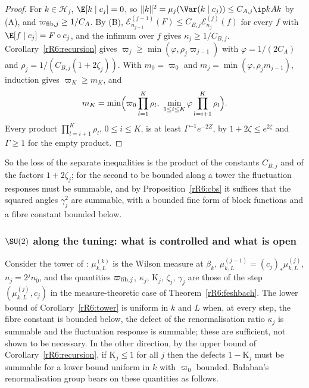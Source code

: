 \begin{proof}
For $k\in\mathcal H_f$, $\E[k\mid c_j]=0$, so $\lVert k\rVert^2=\mu_j(\Var
(k\mid c_j))\le C_{A,j}\ip kAk$ by (A), and $\varpi_{{\rm fib},j}\ge1/C_A$.
By (B), $\mathcal E^{(j-1)}_{n_{j-1}}(F)\le C_{B,j}\mathcal E^{(j)}_{n_j}(f)$
for every $f$ with $\E[f\mid c_j]=F\circ c_j$, and the infimum over $f$
gives $\kappa_j\ge1/C_{B,j}$. Corollary~\ref{rR6:recursion} gives
$\varpi_j\ge\min(\varphi,\rho_j\varpi_{j-1})$ with $\varphi=1/(2C_A)$ and
$\rho_j=1/(C_{B,j}(1+2\zeta_j))$. With $m_0=\varpi_0$ and $m_j=\min(\varphi,
\rho_jm_{j-1})$, induction gives $\varpi_K\ge m_K$, and
\[
m_K=\min\Bigl(\varpi_0\prod_{l=1}^K\rho_l,\ \min_{1\le i\le K}\varphi
\prod_{l=i+1}^K\rho_l\Bigr).
\]
Every product $\prod_{l=i+1}^K\rho_l$, $0\le i\le K$, is at least
$\Gamma^{-1}e^{-2Z}$, by $1+2\zeta\le e^{2\zeta}$ and $\Gamma\ge1$ for the
empty product.
\end{proof}

So the loss of the separate inequalities is the product of the constants
$C_{B,j}$ and of the factors $1+2\zeta_j$; for the second to be bounded
along a tower the fluctuation responses must be summable, and by
Proposition~\ref{rR6:cbs} it suffices that the squared angles $\gamma_j^2$
are summable, with a bounded fine form of block functions and a fibre
constant bounded below.
\subsubsection{$\SU(2)$ along the tuning: what is controlled and what is
open}

Consider the tower of \cite[Corollary~102]{BBLR26}: $\mu^{(k)}_{k,L}$ is
the Wilson measure at $\beta_k$, $\mu^{(j-1)}_{k,L}=(c_j)_*\mu^{(j)}_{k,L}$,
$n_j=2^jn_0$, and the quantities $\varpi_{{\rm fib},j}$, $\kappa_j$, $\mathrm
K_j$, $\zeta_j$, $\gamma_j$ are those of the step $(\mu^{(j)}_{k,L},c_j)$ in
the measure-theoretic case of Theorem~\ref{rR6:feshbach}. The lower
bound of Corollary~\ref{rR6:tower} is uniform in $k$ and $L$ when, at every
step, the fibre constant is bounded below, the defect of the
renormalisation ratio $\kappa_j$ is summable and the fluctuation response
is summable; these are sufficient, not shown to be necessary. In the other
direction, by the upper bound of Corollary~\ref{rR6:recursion}, if
$\mathrm K_j\le1$ for all $j$ then the defects $1-\mathrm K_j$ must be
summable for a lower bound uniform in $k$ with $\varpi_0$ bounded. Ba{\l}aban's renormalisation group bears on
these quantities as follows.

